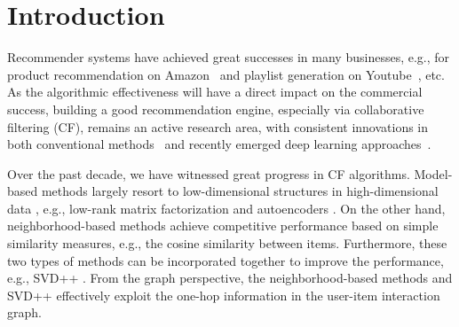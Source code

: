 \documentclass[sigconf]{acmart}
\begin{document}
\maketitle

\section{Introduction}
Recommender systems have achieved great successes in many businesses, e.g., for product recommendation on Amazon~\cite{amazon} and playlist generation on Youtube~\cite{covington2016deep}, etc. As the algorithmic effectiveness will have a direct impact on the commercial success, building a good recommendation engine, especially via collaborative filtering (CF), remains an active research area, with consistent innovations in both conventional methods~\cite{rendle2012bpr,koren2008factorization,chen2021scalable} and recently emerged deep learning approaches~\cite{liang2018variational,he2017neural,he2020lightgcn}. 

Over the past decade, we have witnessed great progress in CF algorithms. Model-based methods largely resort to low-dimensional structures in high-dimensional data \cite{Wright-Ma-2021}, e.g., low-rank matrix factorization \cite{hu2008collaborative,pan2008one,chen2021scalable,mrma}  and autoencoders \cite{wu2016collaborative,liang2018variational,steck2020autoencoders}. On the other hand, neighborhood-based methods \cite{aiolli2013efficient,verstrepen2014unifying} achieve competitive performance based on simple similarity measures, e.g., the cosine similarity between items. Furthermore, these two types of methods can be incorporated together to improve the performance, e.g., SVD++ \cite{koren2008factorization}. From the graph perspective, the neighborhood-based methods and SVD++ effectively exploit the one-hop information in the user-item interaction graph. 
\end{document}
